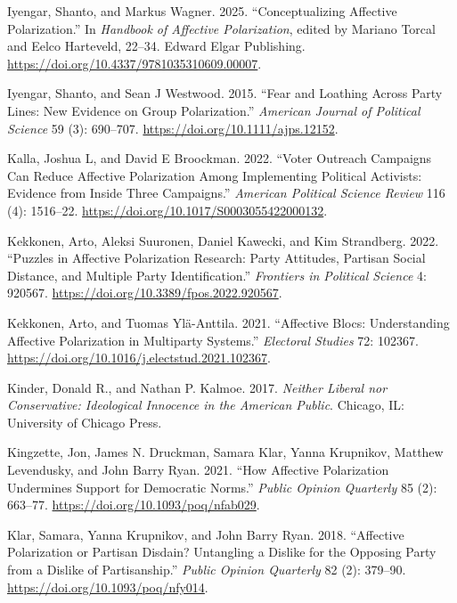 \documentclass[
  12pt,
  a4paper,
  DIV=11,
  numbers=noendperiod]{scrartcl}
\newlength{\cslhangindent}
\newenvironment{CSLReferences}[2] %
 {\begin{list}{}{%
  \setlength{\itemindent}{0pt}
  \setlength{\leftmargin}{0pt}
  \setlength{\parsep}{0pt}
  \ifodd #1
   \setlength{\leftmargin}{\cslhangindent}
   \setlength{\itemindent}{-1\cslhangindent}
  \fi
  \setlength{\itemsep}{#2\baselineskip}}}
 {\end{list}}
\begin{document}
\begin{CSLReferences}{1}{0}
Iyengar, Shanto, and Markus Wagner. 2025. {``Conceptualizing Affective
Polarization.''} In \emph{Handbook of Affective Polarization}, edited by
Mariano Torcal and Eelco Harteveld, 22--34. Edward Elgar Publishing.
\url{https://doi.org/10.4337/9781035310609.00007}.

Iyengar, Shanto, and Sean J Westwood. 2015. {``Fear and Loathing Across
Party Lines: New Evidence on Group Polarization.''} \emph{American
Journal of Political Science} 59 (3): 690--707.
\url{https://doi.org/10.1111/ajps.12152}.

Kalla, Joshua L, and David E Broockman. 2022. {``Voter Outreach
Campaigns Can Reduce Affective Polarization Among Implementing Political
Activists: Evidence from Inside Three Campaigns.''} \emph{American
Political Science Review} 116 (4): 1516--22.
\url{https://doi.org/10.1017/S0003055422000132}.

Kekkonen, Arto, Aleksi Suuronen, Daniel Kawecki, and Kim Strandberg.
2022. {``Puzzles in Affective Polarization Research: Party Attitudes,
Partisan Social Distance, and Multiple Party Identification.''}
\emph{Frontiers in Political Science} 4: 920567.
\url{https://doi.org/10.3389/fpos.2022.920567}.

Kekkonen, Arto, and Tuomas Ylä-Anttila. 2021. {``Affective Blocs:
Understanding Affective Polarization in Multiparty Systems.''}
\emph{Electoral Studies} 72: 102367.
\url{https://doi.org/10.1016/j.electstud.2021.102367}.

Kinder, Donald R., and Nathan P. Kalmoe. 2017. \emph{Neither Liberal nor
Conservative: Ideological Innocence in the American Public}. Chicago,
IL: University of Chicago Press.

Kingzette, Jon, James N. Druckman, Samara Klar, Yanna Krupnikov, Matthew
Levendusky, and John Barry Ryan. 2021. {``How Affective Polarization
Undermines Support for Democratic Norms.''} \emph{Public Opinion
Quarterly} 85 (2): 663--77. \url{https://doi.org/10.1093/poq/nfab029}.

Klar, Samara, Yanna Krupnikov, and John Barry Ryan. 2018. {``Affective
Polarization or Partisan Disdain? Untangling a Dislike for the Opposing
Party from a Dislike of Partisanship.''} \emph{Public Opinion Quarterly}
82 (2): 379--90. \url{https://doi.org/10.1093/poq/nfy014}.


\end{CSLReferences}
\end{document}

